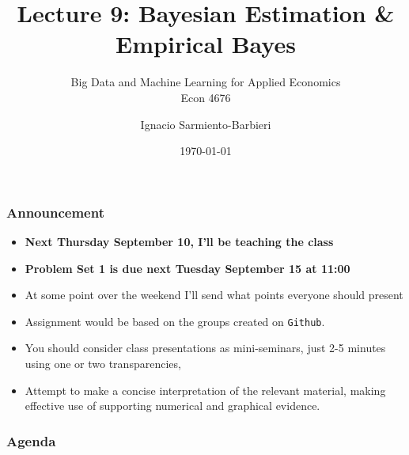 \documentclass[
  shownotes,
  xcolor={svgnames},
  hyperref={colorlinks,citecolor=DarkBlue,linkcolor=DarkRed,urlcolor=DarkBlue}
  ]{beamer}
\begin{document}
\title[Lecture 9]{Lecture 9: Bayesian Estimation \& Empirical Bayes}
\subtitle{Big Data and Machine Learning for Applied Economics \\ Econ 4676}
\date{\today}

\author[Sarmiento-Barbieri]{Ignacio Sarmiento-Barbieri}


\begin{frame}[noframenumbering]
\maketitle
\end{frame}



\begin{frame}
\frametitle{Announcement }


\begin{itemize} 
    \item {\bf Next Thursday September 10, I'll be teaching the class} 
    \bigskip
    \item {\bf Problem Set 1 is due next Tuesday September 15 at 11:00} 
    \bigskip
    \item At some point over the weekend I'll send what points everyone should present
    \bigskip
    \item Assignment would be based on the groups created on \texttt{Github}.
    \bigskip
    \item  You should consider class presentations as mini-seminars, just 2-5 minutes using one or two transparencies, 
    \bigskip
    \item  Attempt to make a concise interpretation of the relevant material, making effective use of supporting numerical and graphical evidence.    
\end{itemize}
\end{frame}


\begin{frame}
\frametitle{Agenda}

\tableofcontents


\end{frame}

\end{document}

